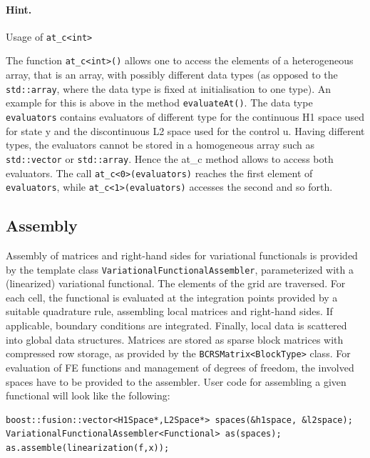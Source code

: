 \documentclass[11pt]{article}
\begin{document}
\paragraph{Hint.} Usage of \verb|at_c<int>|

The function \verb|at_c<int>()| allows one to access the elements of a
heterogeneous array, that is an array, with possibly different data
types (as opposed to the \verb|std::array|, where the data type is fixed
at initialisation to one type). An example for this is above in the method \verb|evaluateAt()|. The data
type \verb|evaluators| contains evaluators of different type for the continuous H1 space used for
state y and the discontinuous L2 space used for the control u. Having
different types, the evaluators cannot be stored in a homogeneous array
such as \verb|std::vector| or \verb|std::array|.
Hence the at\_c method allows to access both
evaluators. The call \verb|at_c<0>(evaluators)| reaches the first element of \verb|evaluators|, while
\verb|at_c<1>(evaluators)| accesses the second and so forth.



\subsection{Assembly} 
Assembly of matrices and right-hand sides for variational functionals is provided by the template class 
{\tt VariationalFunctionalAssembler}, parameterized with a (linearized) variational functional. The elements of the grid are 
traversed. For each cell, the functional is evaluated at the integration points provided by a suitable quadrature rule, 
assembling local matrices and right-hand sides. If applicable, boundary conditions are integrated. Finally, local data is 
scattered into global data structures. Matrices are stored as sparse block matrices with compressed row storage, as 
provided by the \dune{} {\tt BCRSMatrix<BlockType>} class. For evaluation of FE functions and management of degrees of 
freedom, the involved spaces have to be provided to the assembler. User code for assembling a given functional will look 
like the following:

\begin{lstlisting}
boost::fusion::vector<H1Space*,L2Space*> spaces(&h1space, &l2space);
VariationalFunctionalAssembler<Functional> as(spaces);
as.assemble(linearization(f,x));
\end{lstlisting}
\end{document}
